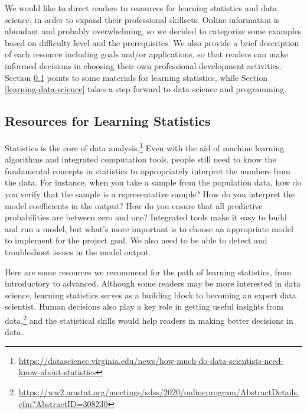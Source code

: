 \documentclass[
]{article}
\begin{document}
We would like to direct readers to resources for learning statistics and
data science, in order to expand their professional skillsets. Online
information is abundant and probably overwhelming, so we decided to
categorize some examples based on difficulty level and the
prerequisites. We also provide a brief description of each resource
including goals and/or applications, so that readers can make informed
decisions in choosing their own professional development activities.
Section \ref{learning-statistics} points to some materials for learning
statistics, while Section \ref{learning-data-science} takes a step
forward to data science and programming.

\hypertarget{learning-statistics}{%
\subsection{Resources for Learning
Statistics}\label{learning-statistics}}

Statistics is the core of data analysis.\footnote{\url{https://datascience.virginia.edu/news/how-much-do-data-scientists-need-know-about-statistics}}
Even with the aid of machine learning algorithms and integrated
computation tools, people still need to know the fundamental concepts in
statistics to appropriately interpret the numbers from the data. For
instance, when you take a sample from the population data, how do you
verify that the sample is a representative sample? How do you interpret
the model coefficients in the output? How do you ensure that all
predictive probabilities are between zero and one? Integrated tools make
it easy to build and run a model, but what's more important is to choose
an appropriate model to implement for the project goal. We also need to
be able to detect and troubleshoot issues in the model output.

Here are some resources we recommend for the path of learning
statistics, from introductory to advanced. Although some readers may be
more interested in data science, learning statistics serves as a
building block to becoming an expert data scientist. Human decisions
also play a key role in getting useful insights from data,\footnote{\url{https://ww2.amstat.org/meetings/sdss/2020/onlineprogram/AbstractDetails.cfm?AbstractID=308230}}
and the statistical skills would help readers in making better decisions
in data.
\end{document}
